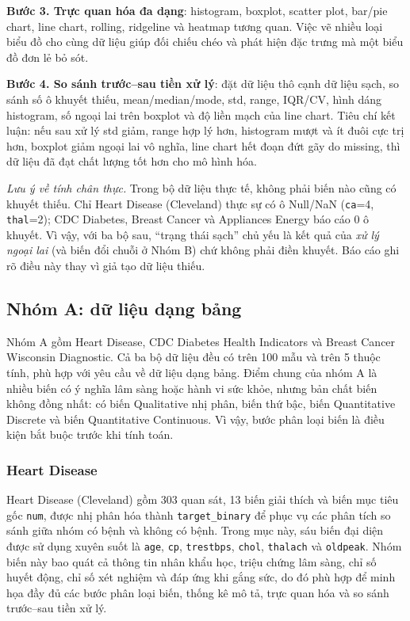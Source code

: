 \textbf{Bước 3. Trực quan hóa đa dạng}: histogram, boxplot, scatter plot, bar/pie chart, line chart, rolling, ridgeline và heatmap tương quan. Việc vẽ nhiều loại biểu đồ cho cùng dữ liệu giúp đối chiếu chéo và phát hiện đặc trưng mà một biểu đồ đơn lẻ bỏ sót.

\textbf{Bước 4. So sánh trước--sau tiền xử lý}: đặt dữ liệu thô cạnh dữ liệu sạch, so sánh số ô khuyết thiếu, mean/median/mode, std, range, IQR/CV, hình dáng histogram, số ngoại lai trên boxplot và độ liền mạch của line chart. Tiêu chí kết luận: nếu sau xử lý std giảm, range hợp lý hơn, histogram mượt và ít đuôi cực trị hơn, boxplot giảm ngoại lai vô nghĩa, line chart hết đoạn đứt gãy do missing, thì dữ liệu đã đạt chất lượng tốt hơn cho mô hình hóa.

\textit{Lưu ý về tính chân thực.} Trong bộ dữ liệu thực tế, không phải biến nào cũng có khuyết thiếu. Chỉ Heart Disease (Cleveland) thực sự có ô Null/NaN (\texttt{ca}=4, \texttt{thal}=2); CDC Diabetes, Breast Cancer và Appliances Energy báo cáo 0 ô khuyết. Vì vậy, với ba bộ sau, ``trạng thái sạch'' chủ yếu là kết quả của \emph{xử lý ngoại lai} (và biến đổi chuỗi ở Nhóm B) chứ không phải điền khuyết. Báo cáo ghi rõ điều này thay vì giả tạo dữ liệu thiếu.

\subsection{Nhóm A: dữ liệu dạng bảng}

Nhóm A gồm Heart Disease, CDC Diabetes Health Indicators và Breast Cancer Wisconsin Diagnostic. Cả ba bộ dữ liệu đều có trên 100 mẫu và trên 5 thuộc tính, phù hợp với yêu cầu về dữ liệu dạng bảng. Điểm chung của nhóm A là nhiều biến có ý nghĩa lâm sàng hoặc hành vi sức khỏe, nhưng bản chất biến không đồng nhất: có biến Qualitative nhị phân, biến thứ bậc, biến Quantitative Discrete và biến Quantitative Continuous. Vì vậy, bước phân loại biến là điều kiện bắt buộc trước khi tính toán.

\subsubsection{Heart Disease}

Heart Disease (Cleveland) gồm 303 quan sát, 13 biến giải thích và biến mục tiêu gốc \texttt{num}, được nhị phân hóa thành \texttt{target\_binary} để phục vụ các phân tích so sánh giữa nhóm có bệnh và không có bệnh. Trong mục này, sáu biến đại diện được sử dụng xuyên suốt là \texttt{age}, \texttt{cp}, \texttt{trestbps}, \texttt{chol}, \texttt{thalach} và \texttt{oldpeak}. Nhóm biến này bao quát cả thông tin nhân khẩu học, triệu chứng lâm sàng, chỉ số huyết động, chỉ số xét nghiệm và đáp ứng khi gắng sức, do đó phù hợp để minh họa đầy đủ các bước phân loại biến, thống kê mô tả, trực quan hóa và so sánh trước--sau tiền xử lý.

